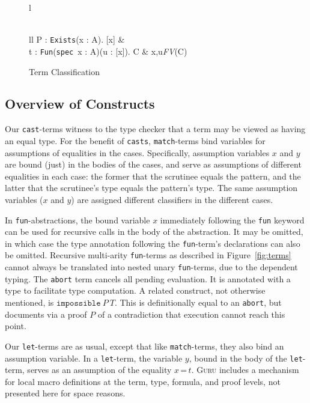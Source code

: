 \documentclass[preprint,natbib]{sigplanconf}
\newcommand{\seq}[3]{#1 \vdash #2 : #3}
\newcommand{\Eq}[0]{\texttt{=}}
\begin{document}
\begin{figure}
\begin{tabular}{l}
\\
\\

\infer{\seq{\Gamma}{\texttt{existse\_term}\ P\ t}{C}}
{\begin{array}{ll}
\seq{\Gamma}{P}{\texttt{Exists}(x : A). [x]} &\ \\
\seq{\Gamma}{t}{\texttt{Fun}(\texttt{spec}\ x : A)(u : \hat{F}[x]). C & x,u\not\in\textit{FV}(C)}
\end{array}}

\end{tabular}
\caption{\label{fig:cl-term}Term Classification}
\end{figure}

\subsection{Overview of Constructs}

Our \texttt{cast}-terms witness to the type checker that a term may be
viewed as having an equal type.  For the benefit of \texttt{casts},
\texttt{match}-terms bind variables for assumptions of equalities in
the cases.  Specifically, assumption variables $x$ and $y$ are bound
(just) in the bodies of the cases, and serve as assumptions of
different equalities in each case: the former that the scrutinee
equals the pattern, and the latter that the scrutinee's type equals
the pattern's type.  The same assumption variables ($x$ and $y$) are
assigned different classifiers in the different cases.  

In \texttt{fun}-abstractions, the bound variable $x$ immediately
following the \texttt{fun} keyword can be used for recursive calls in
the body of the abstraction.  It may be omitted, in which case the
type annotation following the \texttt{fun}-term's declarations can
also be omitted.  Recursive multi-arity \texttt{fun}-terms as
described in Figure~\ref{fig:terms} cannot always be translated into
nested unary \texttt{fun}-terms, due to the dependent typing.  The
\texttt{abort} term cancels all pending evaluation.  It is annotated
with a type to facilitate type computation.  A related construct, not
otherwise mentioned, is $\texttt{impossible}\ P\ T$.  This is
definitionally equal to an \texttt{abort}, but documents via a proof
$P$ of a contradiction that execution cannot reach this point.

Our \texttt{let}-terms are as usual, except that like
\texttt{match}-terms, they also bind an assumption variable.  In a
\texttt{let}-term, the variable $y$, bound in the body of the
\texttt{let}-term, serves as an assumption of the equality ${x\, \Eq\,
t}$.  \textsc{Guru} includes a mechanism for local macro definitions
at the term, type, formula, and proof levels, not presented here for
space reasons.
\end{document}
